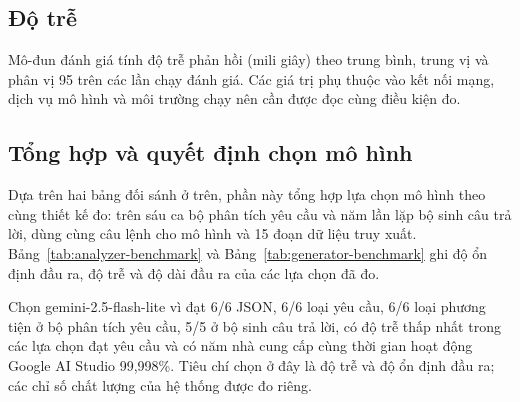 \documentclass[12pt,a4paper,oneside]{report}
\begin{document}
\subsection{Độ trễ}
Mô-đun đánh giá tính độ trễ phản hồi (mili giây) theo trung bình, trung vị và phân vị 95 trên các lần chạy đánh giá. Các giá trị phụ thuộc vào kết nối mạng, dịch vụ mô hình và môi trường chạy nên cần được đọc cùng điều kiện đo.

\subsection{Tổng hợp và quyết định chọn mô hình}
Dựa trên hai bảng đối sánh ở trên, phần này tổng hợp lựa chọn mô hình theo cùng thiết kế đo: trên sáu ca bộ phân tích yêu cầu và năm lần lặp bộ sinh câu trả lời, dùng cùng câu lệnh cho mô hình và 15 đoạn dữ liệu truy xuất. Bảng~\ref{tab:analyzer-benchmark} và Bảng~\ref{tab:generator-benchmark} ghi độ ổn định đầu ra, độ trễ và độ dài đầu ra của các lựa chọn đã đo.

Chọn gemini-2.5-flash-lite vì đạt 6/6 JSON, 6/6 loại yêu cầu, 6/6 loại phương tiện ở bộ phân tích yêu cầu, 5/5 ở bộ sinh câu trả lời, có độ trễ thấp nhất trong các lựa chọn đạt yêu cầu và có năm nhà cung cấp cùng thời gian hoạt động Google AI Studio 99,998\%. Tiêu chí chọn ở đây là độ trễ và độ ổn định đầu ra; các chỉ số chất lượng của hệ thống được đo riêng.
\end{document}
